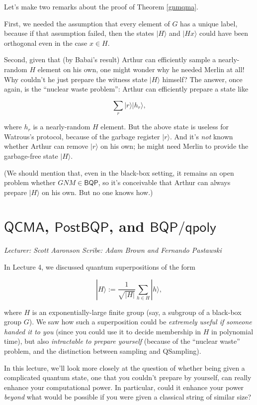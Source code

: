 \documentclass[11pt]{report}
\theoremstyle{plain}
\theoremstyle{definition}
\renewcommand{\ket}[1]{|#1\rangle}
\newcommand{\lecture}[3]{%
  \chapter{#3}%
  \vspace{-5ex}%
  \textit{Lecturer: #1 \hfill Scribe: #2}\par%
  \vspace{1ex}\titlerule\vspace{2ex}}
\begin{document}
Let's make two remarks about the proof of Theorem \ref{gnmqma}.

First, we needed the assumption that every element of $G$ has a unique label, because if that assumption failed, then the states $\ket{H}$ and $\ket{Hx}$ could have been orthogonal even in the case $x\in H$.

Second, given that (by Babai's result) Arthur can efficiently sample a nearly-random $H$ element on his own, one might wonder why he needed Merlin at all!  Why couldn't he just prepare the witness state $\ket{H}$ himself?  The answer, once again, is the ``nuclear waste problem'': Arthur can efficiently prepare a state like

$$\sum_r \ket{r}\ket{h_r},$$

\noindent where $h_r$ is a nearly-random $H$ element.  But the above state is useless for Watrous's protocol, because of the garbage register $\ket{r}$.  And it's {\em not} known whether Arthur can remove $\ket{r}$ on his own; he might need Merlin to provide the garbage-free state $\ket{H}$.

(We should mention that, even in the black-box setting, it remains an open problem whether $GNM\in \mathsf{BQP}$, so it's conceivable that Arthur can always prepare $\ket{H}$ on his own.  But no one knows how.)

\lecture{Scott Aaronson}{Adam Brown and Fernando Pastawski}{$\mathsf{QCMA}$, $\mathsf{PostBQP}$, and $\mathsf{BQP/qpoly}$}

In Lecture 4, we discussed quantum superpositions of the form

$$\ket{H}  := \frac{1}{\sqrt{| H |}} \sum_{h \in H} \ket{h},$$

\noindent where $H$ is an exponentially-large finite group (say, a subgroup of a black-box group $G$).  We saw how such a superposition could be {\em extremely useful if someone handed it to you} (since you could use it to decide membership in $H$ in polynomial time), but also {\em intractable to prepare yourself} (because of the ``nuclear waste'' problem, and the distinction between sampling and QSampling).

In this lecture, we'll look more closely at the question of whether being given a complicated quantum state, one that you couldn't prepare by yourself, can really enhance your computational power.  In particular, could it enhance your power {\em beyond} what would be possible if you were given a classical string of similar size?
\end{document}
